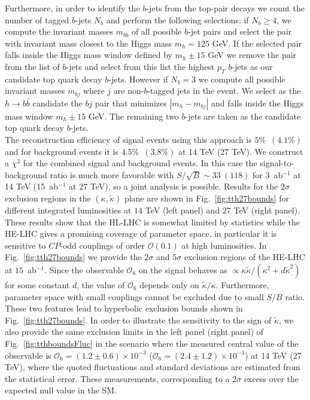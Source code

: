 \documentclass[11pt,a4paper]{article}
\newcommand{\mc}[1]{\mathcal{#1}}
\begin{document}
\noindent Furthermore, in order to identify the $b$-jets from the top-pair decays we count the number of tagged $b$-jets $N_b$ and perform the following selections: if $N_b\ge 4$, we compute the invariant masses $m_{bb}$ of all possible $b$-jet pairs and select the pair with invariant mass closest to the Higgs mass $m_h=125$ GeV. If the selected pair falls inside the Higgs mass window defined by $m_h\pm 15$ GeV we remove the pair from the list of $b$-jets and select from this list the highest $p_T$ $b$-jets as our candidate top quark decay $b$-jets. However if $N_b=3$ we compute all possible invariant masses $m_{bj}$ where $j$ are non-$b$-tagged jets in the event. We select as the $h\to b\bar b$ candidate the $bj$ pair that minimizes $|m_h-m_{bj}|$ and falls inside the Higgs mass window $m_h\pm 15$ GeV. The remaining two $b$-jets are taken as the candidate top quark decay $b$-jets.\\

The reconstruction efficiency of signal events using this approach is $5\%$~$(4.1\%)$ and for background events it is $4.5\%$~$(3.8\%)$ at 14 TeV (27 TeV). We construct a $\chi^2$ for the combined signal and background events. In this case the signal-to-background ratio is much more favorable with $S/\sqrt{B}\sim 33~(118)$ for 3~ab${}^{-1}$ at 14 TeV (15~ab${}^{-1}$ at 27 TeV), so a joint analysis is possible. Results for the $2\sigma$  exclusion regions in the $(\kappa,\tilde\kappa)$ plane are shown in Fig.~\ref{fig:tth27bounds} for different integrated luminosities at $14$ TeV (left panel) and $27$ TeV (right panel). These results show that the HL-LHC is somewhat limited by statistics while the HE-LHC gives a promising coverage of parameter space, in particular it is sensitive to $CP$-odd couplings of order $\mc{O}(0.1)$ at high luminosities. In Fig.~\ref{fig:tth27bounds} we provide the $2\sigma$ and $5\sigma$ exclusion regions of the HE-LHC at $15$~ab$^{-1}$. Since the observable $\mc{O}_6$ on the signal behaves as $\propto \kappa\tilde\kappa/(\kappa^2+d \tilde \kappa^2)$ for some constant $d$, the value of $\mc{O}_6$ depends only on $\tilde \kappa/\kappa$. Furthermore, parameter space with small couplings cannot be excluded due to small $S/B$ ratio. These two features lead
to hyperbolic exclusion bounds shown in Fig.~\ref{fig:tth27bounds}. In order to illustrate the sensitivity to the sign of $\tilde\kappa$, we also provide the same exclusion limits in the left panel (right panel) of Fig.~\ref{fig:tthboundsFluc} in the scenario where the measured central value of the observable is $\mc{O}_6=(1.2 \pm 0.6) \times 10^{-3}$ ($\mc{O}_6=(2.4 \pm 1.2) \times 10^{-4}$) at 14 TeV (27 TeV), where the quoted fluctuations and standard deviations are estimated from the statistical error. These measurements, corresponding to a $2\sigma$ excess over the expected null value in the SM.
\end{document}
